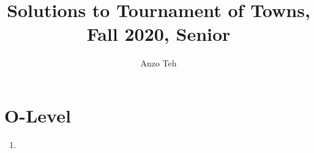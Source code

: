 \documentclass[11pt,a4paper]{article}
\begin{document}
\newcommand{\la}{\leftarrow}
\newcommand{\lra}{\leftrightarrow}
\newcommand{\bbN}{\mathbb{N}}
\newcommand{\bbZ}{\mathbb{Z}}
\newcommand{\dsum}{\displaystyle\sum}
\newcommand{\dprod}{\displaystyle\prod}


\title{Solutions to Tournament of Towns, Fall 2020, Senior}
\author{Anzo Teh}
\date{}
\maketitle

\section*{O-Level}
\begin{enumerate}
	\item
\end{enumerate}
\end{document}
